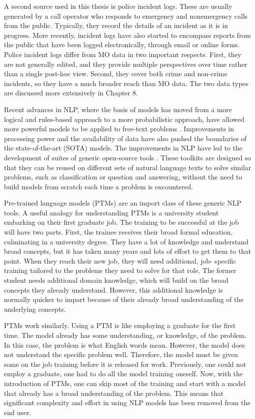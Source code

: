 A second source used in this thesis is police incident logs. These are usually generated by a call operator who responds to emergency and nonemergency calls from the public. Typically, they record the details of an incident as it is in progress. More recently, incident logs have also started to encompass reports from the public that have been logged electronically, through email or online forms. Police incident logs differ from MO data in two important respects. First, they are not generally edited, and they provide multiple perspectives over time rather than a single post-hoc view. Second, they cover both crime and non-crime incidents, so they have a much broader reach than MO data. The two data types are discussed more extensively in Chapter 8.

Recent advances in NLP, where the basis of models has moved from a more logical and rules-based approach to a more probabilistic approach, have allowed more powerful models to be applied to free-text problems \parencite{kumar2011natural}. Improvements in processing power and the availability of data have also pushed the boundaries of the state-of-the-art (SOTA) models. The improvements in NLP have led to the development of suites of generic open-source tools \parencite{manning2014stanford, benoit2018quanteda, loper2002nltk}. These toolkits are designed so that they can be reused on different sets of natural language texts to solve similar problems, such as classification or question and answering, without the need to build models from scratch each time a problem is encountered.

Pre-trained language models (PTMs) are an import class of these generic NLP tools. A useful analogy for understanding PTMs is a university student embarking on their first graduate job. The training to be successful at the job will have two parts. First, the trainee receives their broad formal education,  culminating in a university degree. They have a lot of knowledge and understand broad concepts, but it has taken many years and lots of effort to get them to that point. When they reach their new job, they will need additional, job- specific training tailored to the problems they need to solve for that role. The former student needs additional domain knowledge, which will build on the broad concepts they already understand. However, this additional knowledge is normally quicker to impart because of their already broad understanding of the underlying concepts.

PTMs work similarly. Using a PTM is like employing a graduate for the first time. The model already has some understanding, or knowledge, of the problem. In this case, the problem is what English words mean. However, the model does not understand the specific problem well. Therefore, the model must be given some on the job training before it is released for work. Previously, one could not employ a graduate, one had to do all the model training oneself. Now, with the introduction of PTMs, one can skip most of the training and start with a model that already has a broad understanding of the problem. This means that significant complexity and effort in using NLP models has been removed from the end user.

